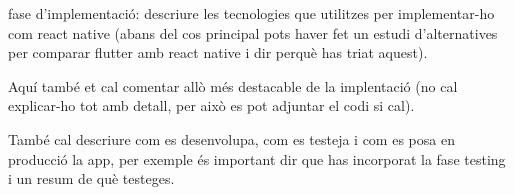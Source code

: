 fase d'implementació:
descriure les tecnologies que utilitzes per implementar-ho com react native
(abans del cos principal pots haver fet un estudi d'alternatives per comparar flutter amb react native
i dir perquè has triat aquest).

Aquí també et cal comentar allò més destacable de la implentació
(no cal explicar-ho tot amb detall, per això es pot adjuntar el codi si cal).

També cal descriure com es desenvolupa, com es testeja i com es posa en producció la app,
per exemple és important dir que has incorporat la fase testing i un resum de què testeges.
